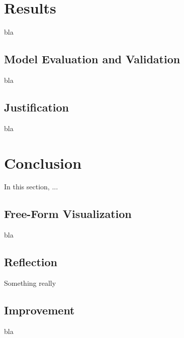 \documentclass[a4paper]{article}
\begin{document}

\section{Results}
\label{sec:results}

bla

\subsection{Model Evaluation and Validation}
bla

\subsection{Justification}
bla


\section{Conclusion}
\label{sec:conclusion}

In this section, ...

\subsection{Free-Form Visualization}

bla

\subsection{Reflection}

Something really \cite{Mohri_2012}

\subsection{Improvement}

bla




\end{document}
